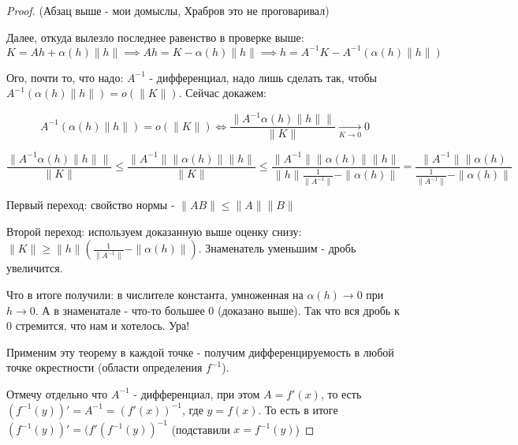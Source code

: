 \begin{proof}
    (Абзац выше - мои домыслы, Храбров это не проговаривал)

    Далее, откуда вылезло последнее равенство в проверке выше: \[
        K = Ah + \alpha(h)\|h\| \implies Ah = K - \alpha(h)\|h\| \implies h = A^{-1}K - A^{-1}(\alpha(h)\|h\|)
    \]

    Ого, почти то, что надо: $A^{-1}$ - дифференциал, надо лишь сделать так, чтобы $A^{-1}(\alpha(h)\|h\|) = o(\|K\|)$. Сейчас докажем:

    \[
        A^{-1}(\alpha(h)\|h\|) = o(\|K\|) \iff \frac{\|A^{-1} \alpha(h) \|h\|\|}{\|K\|} \underset{K \to 0}{\to} 0
    \]

    \[
        \frac{\|A^{-1} \alpha(h) \|h\|\|}{\|K\|} \le \frac{\|A^{-1}\| \|\alpha(h)\| \|h\| }{\|K\|} \le \frac{\|A^{-1}\| \|\alpha(h)\|\|h\|}{\|h\|\frac{1}{\|A^{-1}\|} - \|\alpha(h)\|} = \frac{\|A^{-1}\| \|\alpha(h)}{\frac{1}{\|A^{-1}\|} - \|\alpha(h)\|}
            \]

            Первый переход: свойство нормы - $\|AB\| \le \|A\|\|B\|$

            Второй переход: используем доказанную выше оценку снизу: $\|K\| \ge \|h\|\left( \frac{1}{\|A^{-1}\|} - \|\alpha(h)\|\right)$. Знаменатель уменьшим - дробь увеличится.

        Что в итоге получили: в числителе константа, умноженная на $\alpha(h) \to 0$ при $h \to 0$. А в знаменатале - что-то большее 0 (доказано выше). Так что вся дробь к 0 стремится, что нам и хотелось. Ура!

        Применим эту теорему в каждой точке - получим дифференцируемость в любой точке окрестности (области определения $f^{-1}$).

        Отмечу отдельно что $A^{-1}$ - дифференциал, при этом $A = f'(x)$, то есть $(f^{-1}(y))' = A^{-1} = (f'(x))^{-1}$, где $y = f(x)$. То есть в итоге $(f^{-1}(y))' = (f'(f^{-1}(y))^{-1}$ (подставили $x = f^{-1}(y)$)

    \end{proof}

